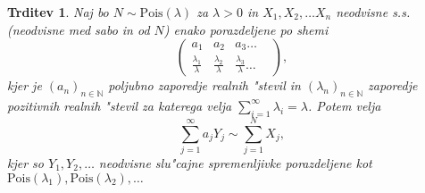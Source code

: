 \documentclass[12pt, a4paper, reqno]{amsart}
\theoremstyle{definition}
\theoremstyle{plain}
\newtheorem{trditev}[definicija]{Trditev}
\newcommand{\N}{\mathbb{N}}
\newcommand{\1}{\mathds{1}}
\newcommand{\Pois}[1]{\text{Pois}(#1)}
\begin{document}
    \begin{trditev}
        Naj bo $N\sim \Pois{\lambda}$  za $\lambda >0$ in $X_1, X_2, \dots X_n$ neodvisne s.s. (neodvisne 
        med sabo in od $N$) enako porazdeljene po shemi
        $$ 
        \begin{pmatrix}
            a_1 & a_2 & a_3  \dots & \\
            \tfrac{\lambda_1}{\lambda} & \tfrac{\lambda_2}{\lambda} & \tfrac{\lambda_3}{\lambda} \dots & 
        \end{pmatrix},
        $$
        kjer je $(a_n)_{n\in\N}$ poljubno zaporedje realnih "stevil in 
        $(\lambda_n)_{n\in\N}$ zaporedje pozitivnih realnih "stevil za katerega velja 
        ${\sum_{i=1}^\infty\lambda_i = \lambda}$.
        Potem velja 
        \begin{equation*}
            \sum_{j=1}^\infty a_jY_j \sim \sum_{j=1}^NX_j,
        \end{equation*}
        kjer so $Y_1,Y_2,  \dots$ neodvisne slu"cajne spremenljivke porazdeljene kot \\
        $\Pois{\lambda_1},\Pois{\lambda_2}, \dots$
        \label{trd:NXjeEnakoaY}
    \end{trditev}
\end{document}
